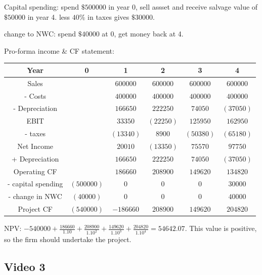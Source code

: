 \documentclass[12pt, letterpaper, parskip = full]{article}
\begin{document}
    Capital spending: spend \(\$500000\) in year 0, sell assset and receive salvage value of \(\$50000\) in year 4. less \(40\%\) in taxes gives \(\$30000\). 

    change to NWC: spend \(\$40000\) at 0, get money back at 4. 

    Pro-forma income \& CF statement: 

    \begin{center}
	\begin{tabular}{|c|c|c|c|c|c|}
		\hline
		Year & 0 & 1 & 2 & 3 & 4 \\
		\hline
		Sales &  & \(600000\) & \(600000\) & \(600000\) & \(600000\) \\
        \hline
        - Costs & & \(400000\) & \(400000\) & \(400000\) & \(400000\) \\
		\hline
        - Depreciation & & \(166650\) & \(222250\) & \(74050\) & \((37050)\) \\
        \hline
        \hline
        EBIT & & \(33350\) & \((22250)\) & \(125950\) & \(162950\) \\
        \hline
        - taxes & & \((13340)\) & \(8900\) & \((50380)\) & \((65180)\) \\
        \hline
        \hline
        Net Income & & \(20010\) & \((13350)\) & \(75570\) & \(97750\) \\
        \hline
        + Depreciation & & \(166650\) & \(222250\) & \(74050\) & \((37050)\) \\
        \hline
        \hline
        Operating CF & & \(186660\) & \(208900\) & \(149620\) & \(134820\) \\
        \hline
        - capital spending & \((500000)\) & \(0\) & \(0\) & \(0\) & \(30000\) \\
        \hline
        - change in NWC &\((40000)\) & \(0\) & \(0\) & \(0\) & \(40000\) \\
        \hline
        \hline
        Project CF & \((540000)\) & \(-186660\) & \(208900\) & \(149620\) & \(204820\) \\
        \hline
	\end{tabular}
	\end{center}

    NPV: \( -540000 + \frac{186660}{1.10} + \frac{208900}{1.10^2} + \frac{149620}{1.10^3} + \frac{204820}{1.10^4} = 54642.07\). This value is positive, so the firm should undertake the project.

    \subsection{Video 3}
\end{document}
